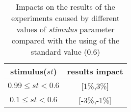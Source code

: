 \begin{table}%
	\small
	\fontsize{6}{6}\selectfont
	\centering
	\caption{Impacts on the results of the experiments caused by different values of \textit{stimulus} parameter compared with the using of the standard value ($0.6$)}
	\label{table:stimulus}
	
	\begin{tabular}{|c|c|} 
	\hline
		stimulus($st$)
		& results impact\\ [1ex]
	\hline	
	$0.99 \leq st <0.6$           & [1\%,3\%] \\[1ex]
	$0.1 \leq st <0.6$           & [-3\%,-1\%] \\[1ex]
	\hline
	\end{tabular}
\end{table} 
